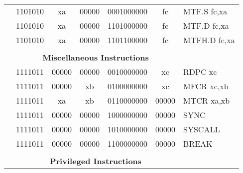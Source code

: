 \begin{table}[p]
\begin{small}
\begin{center}
\begin{tabular}{rcccccccccl}
&
\multicolumn{2}{|c|}{1101010} &
\multicolumn{1}{c|}{xa} &
\multicolumn{1}{c|}{00000} &
\multicolumn{4}{c|}{0001000000} &
\multicolumn{1}{c|}{fc} & MTF.S fc,xa \\
\cline{2-10}
  

&
\multicolumn{2}{|c|}{1101010} &
\multicolumn{1}{c|}{xa} &
\multicolumn{1}{c|}{00000} &
\multicolumn{4}{c|}{1101000000} &
\multicolumn{1}{c|}{fc} & MTF.D fc,xa \\
\cline{2-10}
  

&
\multicolumn{2}{|c|}{1101010} &
\multicolumn{1}{c|}{xa} &
\multicolumn{1}{c|}{00000} &
\multicolumn{4}{c|}{1101100000} &
\multicolumn{1}{c|}{fc} & MTFH.D fc,xa \\
\cline{2-10}
  

&
\multicolumn{9}{c}{} & \\
&
\multicolumn{9}{c}{\bf Miscellaneous Instructions} & \\
\cline{2-10}
  

&
\multicolumn{2}{|c|}{1111011} &
\multicolumn{1}{c|}{00000} &
\multicolumn{1}{c|}{00000} &
\multicolumn{4}{c|}{0010000000} &
\multicolumn{1}{c|}{xc} & RDPC xc \\
\cline{2-10}
  

&
\multicolumn{2}{|c|}{1111011} &
\multicolumn{1}{c|}{00000} &
\multicolumn{1}{c|}{xb} &
\multicolumn{4}{c|}{0100000000} &
\multicolumn{1}{c|}{xc} & MFCR xc,xb \\
\cline{2-10}
  

&
\multicolumn{2}{|c|}{1111011} &
\multicolumn{1}{c|}{xa} &
\multicolumn{1}{c|}{xb} &
\multicolumn{4}{c|}{0110000000} &
\multicolumn{1}{c|}{00000} & MTCR xa,xb \\
\cline{2-10}
  

&
\multicolumn{2}{|c|}{1111011} &
\multicolumn{1}{c|}{00000} &
\multicolumn{1}{c|}{00000} &
\multicolumn{4}{c|}{1000000000} &
\multicolumn{1}{c|}{00000} & SYNC  \\
\cline{2-10}
  

&
\multicolumn{2}{|c|}{1111011} &
\multicolumn{1}{c|}{00000} &
\multicolumn{1}{c|}{00000} &
\multicolumn{4}{c|}{1010000000} &
\multicolumn{1}{c|}{00000} & SYSCALL  \\
\cline{2-10}
  

&
\multicolumn{2}{|c|}{1111011} &
\multicolumn{1}{c|}{00000} &
\multicolumn{1}{c|}{00000} &
\multicolumn{4}{c|}{1100000000} &
\multicolumn{1}{c|}{00000} & BREAK  \\
\cline{2-10}
  

&
\multicolumn{9}{c}{} & \\
&
\multicolumn{9}{c}{\bf Privileged Instructions} & \\
\cline{2-10}
  


\end{tabular}
\end{center}
\end{small}
\end{table}
